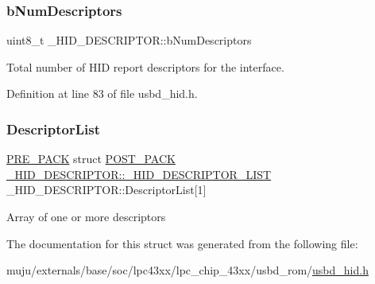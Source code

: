\subsubsection{\texorpdfstring{b\+Num\+Descriptors}{bNumDescriptors}}
{\footnotesize\ttfamily uint8\+\_\+t \+\_\+\+H\+I\+D\+\_\+\+D\+E\+S\+C\+R\+I\+P\+T\+O\+R\+::b\+Num\+Descriptors}

Total number of H\+ID report descriptors for the interface. 

Definition at line 83 of file usbd\+\_\+hid.\+h.

\mbox{\label{struct___h_i_d___d_e_s_c_r_i_p_t_o_r_ab147b0fb12a4d62db59bb05846a48161}} 
\subsubsection{\texorpdfstring{Descriptor\+List}{DescriptorList}}
{\footnotesize\ttfamily \hyperlink{packing_8h_acc3c481448529f669321259811237223}{P\+R\+E\+\_\+\+P\+A\+CK} struct \hyperlink{packing_8h_ab1e9c0309e1375636d619d53c9823b29}{P\+O\+S\+T\+\_\+\+P\+A\+CK} \hyperlink{struct___h_i_d___d_e_s_c_r_i_p_t_o_r_1_1___h_i_d___d_e_s_c_r_i_p_t_o_r___l_i_s_t}{\+\_\+\+H\+I\+D\+\_\+\+D\+E\+S\+C\+R\+I\+P\+T\+O\+R\+::\+\_\+\+H\+I\+D\+\_\+\+D\+E\+S\+C\+R\+I\+P\+T\+O\+R\+\_\+\+L\+I\+ST}  \+\_\+\+H\+I\+D\+\_\+\+D\+E\+S\+C\+R\+I\+P\+T\+O\+R\+::\+Descriptor\+List\mbox{[}1\mbox{]}}

Array of one or more descriptors 

The documentation for this struct was generated from the following file\+:\begin{DoxyCompactItemize}
\item 
muju/externals/base/soc/lpc43xx/lpc\+\_\+chip\+\_\+43xx/usbd\+\_\+rom/\hyperlink{usbd__hid_8h}{usbd\+\_\+hid.\+h}\end{DoxyCompactItemize}
